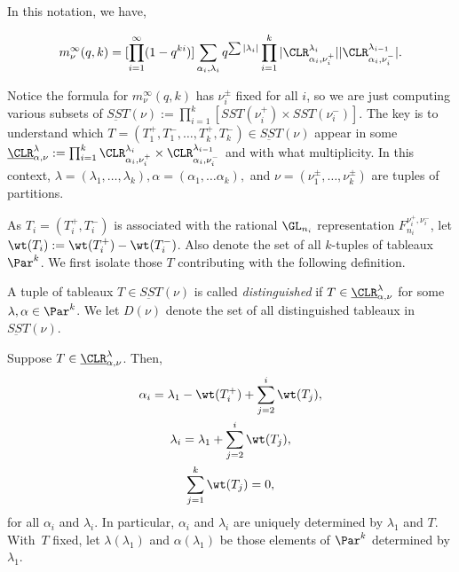 In this notation, we have,

$$m_\nu^\infty(q,k) = [\prod_{i=1}^\infty(1-q^{ki})]\sum_{\alpha_i, \lambda_i} q^{\sum |\lambda_i|}\prod_{i=1}^k
    |\CLR^{\lambda_i}_{\alpha_i, \nu_i^+}| |\CLR^{\lambda_{i-1}}_{\alpha_i, \nu_i^-}|.$$

    
Notice the formula for $m_\nu^\infty(q,k)$ has $\nu_i^\pm$ fixed for all $i$, so we are just computing various subsets of $\underbar{SST}(\nu) := \prod_{i=1}^k [SST(\nu_i^+) \times SST(\nu_i^-)]$. The key is to understand which $T = (T_1^+,T_1^-, \dots , T_k^+, T_k^-)\in \underbar{SST}(\nu)$ appear in some $\underbar{\CLR}^\lambda_{\alpha, \nu} := \prod_{i=1}^k \CLR^{\lambda_i}_{\alpha_i, \nu_i^+} \times \CLR^{\lambda_{i-1}}_{\alpha_i, \nu_i^-}$ and with what multiplicity. In this context, $\lambda = (\lambda_1, \dots , \lambda_k), \alpha = (\alpha_1, \dots \alpha_k),$ and $\nu = (\nu_1^\pm, \dots, \nu_k^\pm)$ are tuples of partitions.

As $T_i = (T_i^+, T_i^-)$ is associated with the rational $\GL_{n_i}$ representation $F^{\nu_i^+, \nu_i^-}_{n_i}$, let $\wt(T_i) := \wt(T_i^+) - \wt(T_i^-)$. Also denote the set of all $k$-tuples of tableaux $\Par^k$. We first isolate those $T$ contributing with the following definition.

\begin{defn}
    A tuple of tableaux $T\in \underbar{SST}(\nu)$ is called \emph{distinguished} if $T \in \underbar{\CLR}^\lambda_{\alpha, \nu}$ for some $\lambda, \alpha \in \Par^k$. We let $D(\nu)$ denote the set of all distinguished tableaux in $\underbar{SST}(\nu)$.
\end{defn}

\begin{lemma} \label{lemma-alphalambda}
    Suppose $T\in \underbar{\CLR}^\lambda_{\alpha, \nu}$. Then,
    \begin{gather*}
    \alpha_i = \lambda_1 - \wt(T_i^+) + \sum_{j=2}^i \wt(T_j),\\
    \lambda_i = \lambda_1 + \sum_{j=2}^{i} \wt(T_j),\\
    \sum_{j=1}^k \wt(T_j) = 0,
    \end{gather*}
    for all $\alpha_i$ and $\lambda_i$. In particular, $\alpha_i$ and $\lambda_i$ are uniquely determined by $\lambda_1$ and $T$. With~$T$ fixed, let $\lambda(\lambda_1)$ and $\alpha(\lambda_1)$ be those elements of $\Par^k$ determined by $\lambda_1$.
\end{lemma}


